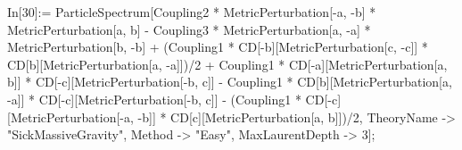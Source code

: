 In[30]:= ParticleSpectrum[Coupling2 * MetricPerturbation[-a, -b] * MetricPerturbation[a, b] - Coupling3 * MetricPerturbation[a, -a] * MetricPerturbation[b, -b] + (Coupling1 * CD[-b][MetricPerturbation[c, -c]] * CD[b][MetricPerturbation[a, -a]])/2 + Coupling1 * CD[-a][MetricPerturbation[a, b]] * CD[-c][MetricPerturbation[-b, c]] - Coupling1 * CD[b][MetricPerturbation[a, -a]] * CD[-c][MetricPerturbation[-b, c]] - (Coupling1 * CD[-c][MetricPerturbation[-a, -b]] * CD[c][MetricPerturbation[a, b]])/2, TheoryName -> "SickMassiveGravity", Method -> "Easy", MaxLaurentDepth -> 3]; 